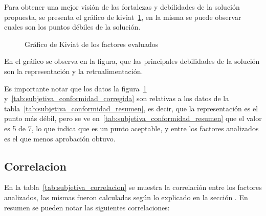Para obtener una mejor visión de las fortalezas y debilidades de la solución
propuesta, se presenta el gráfico de kiviat~\ref{fig:subjetiva_kiviat}, en la
misma se puede observar cuales son los puntos débiles de la solución.

\begin{figure}[!ht]
\label{fig:subjetiva_kiviat}
\caption{Gráfico de Kiviat de los factores evaluados}
\end{figure}

En el gráfico se observa en la figura, que las principales debilidades de
la solución son la representación y la retroalimentación.

Es importante notar que los datos la figura~\ref{fig:subjetiva_kiviat}
y~\ref{tab:subjetiva_conformidad_corregida} son relativas a los datos de la
tabla~\ref{tab:subjetiva_conformidad_resumen}, es decir, que la representación
es el punto más débil, pero se ve en~\ref{tab:subjetiva_conformidad_resumen}
que el valor es 5 de 7, lo que indica que es un punto aceptable, y entre
los factores analizados es el que menos aprobación obtuvo.



\subsection{Correlacion}

En la tabla~\ref{tab:subjetiva_correlacion} se muestra la correlación entre los
factores analizados, las mismas fueron calculadas según lo explicado en la
sección . En resumen se pueden notar las
siguientes correlaciones:

